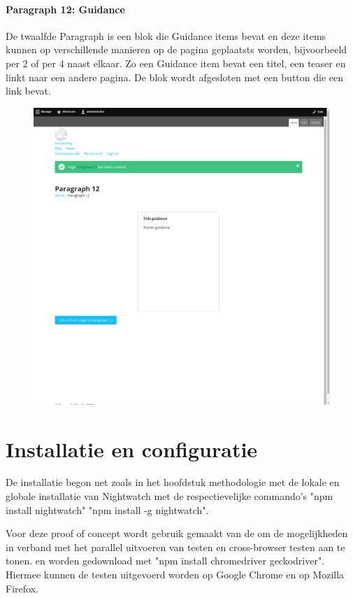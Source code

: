 \paragraph{Paragraph 12: Guidance}
De twaalfde Paragraph is een blok die Guidance items bevat en deze items kunnen op verschillende manieren op de pagina geplaatsts worden, bijvoorbeeld per 2 of per 4 naast elkaar. Zo een Guidance item bevat een titel, een teaser en linkt naar een andere pagina. De blok wordt afgesloten met een button die een link bevat.
\begin{figure}[h]
\includegraphics[width=1\textwidth]{img/p012.png}
\end{figure}

\clearpage
\section{Installatie en configuratie}
De installatie begon net zoals in het hoofdstuk methodologie met de lokale en globale installatie van Nightwatch met de respectievelijke commando's "npm install nightwatch" "npm install -g nightwatch".

Voor deze proof of concept wordt gebruik gemaakt van de \textcite{SeleniumStandaloneServer} om de mogelijkheden in verband met het parallel uitvoeren van testen en cross-browser testen aan te tonen. \textcite{ChromeDriver2018} en \textcite{GeckoDriver} worden gedownload met "npm install chromedriver geckodriver". Hiermee kunnen de testen uitgevoerd worden op Google Chrome en op Mozilla Firefox.

